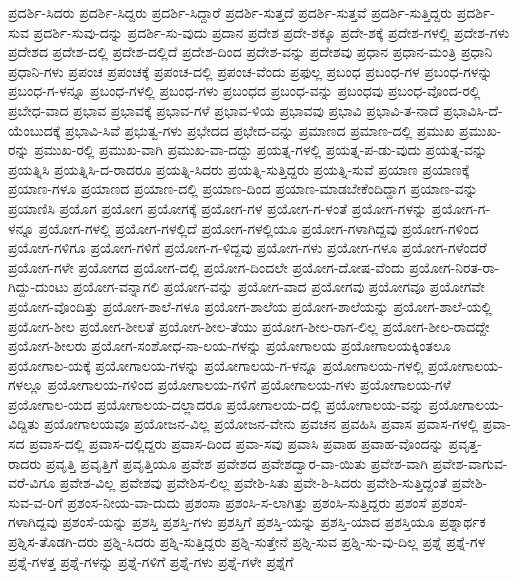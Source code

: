 {ಪ್ರದರ್ಶಿ-ಸಿದರು
ಪ್ರದರ್ಶಿ-ಸಿದ್ದರು
ಪ್ರದರ್ಶಿ-ಸಿದ್ದಾರೆ
ಪ್ರದರ್ಶಿ-ಸುತ್ತದೆ
ಪ್ರದರ್ಶಿ-ಸುತ್ತವೆ
ಪ್ರದರ್ಶಿ-ಸುತ್ತಿದ್ದರು
ಪ್ರದರ್ಶಿ-ಸುವ
ಪ್ರದರ್ಶಿ-ಸುವು-ದನ್ನು
ಪ್ರದರ್ಶಿ-ಸು-ವುದು
ಪ್ರದಾನ
ಪ್ರದೇಶ
ಪ್ರದೇ-ಶಕ್ಕೂ
ಪ್ರದೇ-ಶಕ್ಕೆ
ಪ್ರದೇಶ-ಗಳಲ್ಲಿ
ಪ್ರದೇಶ-ಗಳು
ಪ್ರದೇಶದ
ಪ್ರದೇಶ-ದಲ್ಲಿ
ಪ್ರದೇಶ-ದಲ್ಲಿದೆ
ಪ್ರದೇಶ-ದಿಂದ
ಪ್ರದೇಶ-ವನ್ನು
ಪ್ರದೇಶವು
ಪ್ರಧಾನ
ಪ್ರಧಾನ-ಮಂತ್ರಿ
ಪ್ರಧಾನಿ
ಪ್ರಧಾನಿ-ಗಳು
ಪ್ರಪಂಚ
ಪ್ರಪಂಚಕ್ಕೆ
ಪ್ರಪಂಚ-ದಲ್ಲಿ
ಪ್ರಪಂಚ-ವೆಂದು
ಪ್ರಫುಲ್ಲ
ಪ್ರಬಂಧ
ಪ್ರಬಂಧ-ಗಳ
ಪ್ರಬಂಧ-ಗಳನ್ನು
ಪ್ರಬಂಧ-ಗ-ಳನ್ನೂ
ಪ್ರಬಂಧ-ಗಳಲ್ಲಿ
ಪ್ರಬಂಧ-ಗಳು
ಪ್ರಬಂಧದ
ಪ್ರಬಂಧ-ವನ್ನು
ಪ್ರಬಂಧವು
ಪ್ರಬಂಧ-ವೊಂದ-ರಲ್ಲಿ
ಪ್ರಬೇಧ-ವಾದ
ಪ್ರಭಾವ
ಪ್ರಭಾವಕ್ಕೆ
ಪ್ರಭಾವ-ಗಳೆ
ಪ್ರಭಾವ-ಳಿಯ
ಪ್ರಭಾವವು
ಪ್ರಭಾವಿ
ಪ್ರಭಾವಿ-ತ-ನಾದೆ
ಪ್ರಭಾವಿಸಿ-ದೆ-ಯೆಂಬುದಕ್ಕೆ
ಪ್ರಭಾವಿ-ಸಿವೆ
ಪ್ರಭುತ್ವ-ಗಳು
ಪ್ರಭೇದದ
ಪ್ರಭೇದ-ವನ್ನು
ಪ್ರಮಾಣದ
ಪ್ರಮಾಣ-ದಲ್ಲಿ
ಪ್ರಮುಖ
ಪ್ರಮುಖ-ರನ್ನು
ಪ್ರಮುಖ-ರಲ್ಲಿ
ಪ್ರಮುಖ-ವಾಗಿ
ಪ್ರಮುಖ-ವಾ-ದದ್ದು
ಪ್ರಯತ್ನ-ಗಳಲ್ಲಿ
ಪ್ರಯತ್ನ-ಪ-ಡು-ವುದು
ಪ್ರಯತ್ನ-ವನ್ನು
ಪ್ರಯತ್ನಿಸಿ
ಪ್ರಯತ್ನಿಸಿ-ದ-ರಾದರೂ
ಪ್ರಯತ್ನಿ-ಸಿದರು
ಪ್ರಯತ್ನಿ-ಸುತ್ತಿದ್ದರು
ಪ್ರಯತ್ನಿ-ಸುವೆ
ಪ್ರಯಾಣ
ಪ್ರಯಾಣಕ್ಕೆ
ಪ್ರಯಾಣ-ಗಳೂ
ಪ್ರಯಾಣದ
ಪ್ರಯಾಣ-ದಲ್ಲಿ
ಪ್ರಯಾಣ-ದಿಂದ
ಪ್ರಯಾಣ-ಮಾಡಬೇಕೆಂದಿದ್ದಾಗ
ಪ್ರಯಾಣ-ವನ್ನು
ಪ್ರಯಾಣಿಸಿ
ಪ್ರಯೊಗ
ಪ್ರಯೋಗ
ಪ್ರಯೋಗಕ್ಕೆ
ಪ್ರಯೋಗ-ಗಳ
ಪ್ರಯೋಗ-ಗ-ಳಂತೆ
ಪ್ರಯೋಗ-ಗಳನ್ನು
ಪ್ರಯೋಗ-ಗ-ಳನ್ನೂ
ಪ್ರಯೋಗ-ಗಳಲ್ಲಿ
ಪ್ರಯೋಗ-ಗಳಲ್ಲಿದೆ
ಪ್ರಯೋಗ-ಗಳಲ್ಲಿಯೂ
ಪ್ರಯೋಗ-ಗಳಾಗಿದ್ದವು
ಪ್ರಯೋಗ-ಗಳಿಂದ
ಪ್ರಯೋಗ-ಗಳಿಗೂ
ಪ್ರಯೋಗ-ಗಳಿಗೆ
ಪ್ರಯೋಗ-ಗ-ಳಿದ್ದವು
ಪ್ರಯೋಗ-ಗಳು
ಪ್ರಯೋಗ-ಗಳೂ
ಪ್ರಯೋಗ-ಗಳೆಂದರೆ
ಪ್ರಯೋಗ-ಗಳೇ
ಪ್ರಯೋಗದ
ಪ್ರಯೋಗ-ದಲ್ಲಿ
ಪ್ರಯೋಗ-ದಿಂದಲೇ
ಪ್ರಯೋಗ-ದೋಷ-ವೆಂದು
ಪ್ರಯೋಗ-ನಿರತ-ರಾ-ಗಿದ್ದು-ದುಂಟು
ಪ್ರಯೋಗ-ವನ್ನಾಗಲಿ
ಪ್ರಯೋಗ-ವನ್ನು
ಪ್ರಯೋಗ-ವಾದ
ಪ್ರಯೋಗವು
ಪ್ರಯೋಗವೂ
ಪ್ರಯೋಗವೇ
ಪ್ರಯೋಗ-ವೊಂದಿತ್ತು
ಪ್ರಯೋಗ-ಶಾಲೆ-ಗಳೂ
ಪ್ರಯೋಗ-ಶಾಲೆಯ
ಪ್ರಯೋಗ-ಶಾಲೆಯನ್ನು
ಪ್ರಯೋಗ-ಶಾಲೆ-ಯಲ್ಲಿ
ಪ್ರಯೋಗ-ಶೀಲ
ಪ್ರಯೋಗ-ಶೀಲತೆ
ಪ್ರಯೋಗ-ಶೀಲ-ತೆಯು
ಪ್ರಯೋಗ-ಶೀಲ-ರಾಗ-ಲಿಲ್ಲ
ಪ್ರಯೋಗ-ಶೀಲ-ರಾದದ್ದೇ
ಪ್ರಯೋಗ-ಶೀಲರು
ಪ್ರಯೋಗ-ಸಂಶೋಧ-ನಾ-ಲಯ-ಗಳನ್ನು
ಪ್ರಯೋಗಾಲಯ
ಪ್ರಯೋಗಾಲಯಕ್ಕಿಂತಲೂ
ಪ್ರಯೋಗಾಲ-ಯಕ್ಕೆ
ಪ್ರಯೋಗಾಲಯ-ಗಳನ್ನು
ಪ್ರಯೋಗಾಲಯ-ಗ-ಳನ್ನೂ
ಪ್ರಯೋಗಾಲಯ-ಗಳಲ್ಲಿ
ಪ್ರಯೋಗಾಲಯ-ಗಳಲ್ಲೂ
ಪ್ರಯೋಗಾಲಯ-ಗಳಿಂದ
ಪ್ರಯೋಗಾಲಯ-ಗಳಿಗೆ
ಪ್ರಯೋಗಾಲಯ-ಗಳು
ಪ್ರಯೋಗಾಲಯ-ಗಳೆ
ಪ್ರಯೋಗಾಲ-ಯದ
ಪ್ರಯೋಗಾಲಯ-ದಲ್ಲಾದರೂ
ಪ್ರಯೋಗಾಲಯ-ದಲ್ಲಿ
ಪ್ರಯೋಗಾಲಯ-ವನ್ನು
ಪ್ರಯೋಗಾಲಯ-ವಿದ್ದಿತು
ಪ್ರಯೋಗಾಲಯವೂ
ಪ್ರಯೋಜನ-ವಿಲ್ಲ
ಪ್ರಯೋಜನ-ವೇನು
ಪ್ರವಚನ
ಪ್ರವಹಿಸಿ
ಪ್ರವಾಸ
ಪ್ರವಾಸ-ಗಳಲ್ಲಿ
ಪ್ರವಾ-ಸದ
ಪ್ರವಾಸ-ದಲ್ಲಿ
ಪ್ರವಾಸ-ದಲ್ಲಿದ್ದರು
ಪ್ರವಾಸ-ದಿಂದ
ಪ್ರವಾ-ಸವು
ಪ್ರವಾಸಿ
ಪ್ರವಾಹ
ಪ್ರವಾಹ-ವೊಂದನ್ನು
ಪ್ರವೃತ್ತ-ರಾದರು
ಪ್ರವೃತ್ತಿ
ಪ್ರವೃತ್ತಿಗೆ
ಪ್ರವೃತ್ತಿಯೂ
ಪ್ರವೇಶ
ಪ್ರವೇಶದ
ಪ್ರವೇಶದ್ವಾರ-ವಾ-ಯಿತು
ಪ್ರವೇಶ-ವಾಗಿ
ಪ್ರವೇಶ-ವಾಗುವ-ವರೆ-ವಿಗೂ
ಪ್ರವೇಶ-ವಿಲ್ಲ
ಪ್ರವೇಶವು
ಪ್ರವೇಶಿಸ-ಲಿಲ್ಲ
ಪ್ರವೇಶಿ-ಸಿತು
ಪ್ರವೇ-ಶಿ-ಸಿದರು
ಪ್ರವೇಶಿ-ಸುತ್ತಿದ್ದಂತೆ
ಪ್ರವೇಶಿ-ಸುವ-ವ-ರಿಗೆ
ಪ್ರಶಂಸ-ನೀಯ-ವಾ-ದುದು
ಪ್ರಶಂಸಾ
ಪ್ರಶಂಸಿ-ಸ-ಲಾಗಿತ್ತು
ಪ್ರಶಂಸಿ-ಸುತ್ತಿದ್ದರು
ಪ್ರಶಂಸೆ
ಪ್ರಶಂಸೆ-ಗಳಾಗಿದ್ದವು
ಪ್ರಶಂಸೆ-ಯನ್ನು
ಪ್ರಶಸ್ತಿ
ಪ್ರಶಸ್ತಿ-ಗಳು
ಪ್ರಶಸ್ತಿಗೆ
ಪ್ರಶಸ್ತಿ-ಯನ್ನು
ಪ್ರಶಸ್ತಿ-ಯಾದ
ಪ್ರಶಸ್ತಿಯೂ
ಪ್ರಶ್ನಾರ್ಥಕ
ಪ್ರಶ್ನಿಸ-ತೊಡಗಿ-ದರು
ಪ್ರಶ್ನಿ-ಸಿದರು
ಪ್ರಶ್ನಿ-ಸುತ್ತಿದ್ದರು
ಪ್ರಶ್ನಿ-ಸುತ್ತೇನೆ
ಪ್ರಶ್ನಿ-ಸುವ
ಪ್ರಶ್ನಿ-ಸು-ವು-ದಿಲ್ಲ
ಪ್ರಶ್ನೆ
ಪ್ರಶ್ನೆ-ಗಳ
ಪ್ರಶ್ನೆ-ಗಳತ್ತ
ಪ್ರಶ್ನೆ-ಗಳನ್ನು
ಪ್ರಶ್ನೆ-ಗಳಿಗೆ
ಪ್ರಶ್ನೆ-ಗಳು
ಪ್ರಶ್ನೆ-ಗಳೇ
ಪ್ರಶ್ನೆಗೆ
}
